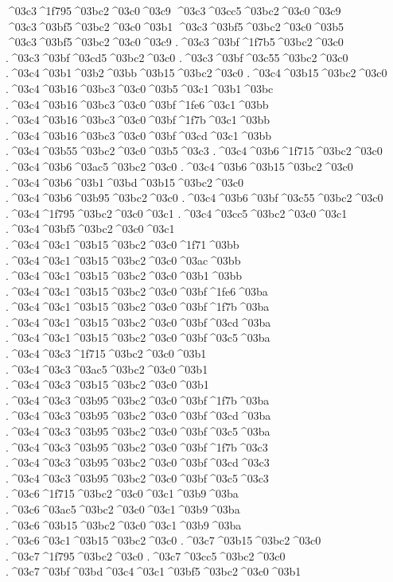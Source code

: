 {^^^^03c3^^^^1f795^^^^03bc2^^^^03c0^^^^03c9  ^^^^03c3^^^^03cc5^^^^03bc2^^^^03c0^^^^03c9
^^^^03c3^^^^03bf5^^^^03bc2^^^^03c0^^^^03b1
^^^^03c3^^^^03bf5^^^^03bc2^^^^03c0^^^^03b5
^^^^03c3^^^^03bf5^^^^03bc2^^^^03c0^^^^03c9
.^^^^03c3^^^^03bf^^^^1f7b5^^^^03bc2^^^^03c0  .^^^^03c3^^^^03bf^^^^03cd5^^^^03bc2^^^^03c0
.^^^^03c3^^^^03bf^^^^03c55^^^^03bc2^^^^03c0
.^^^^03c4^^^^03b1^^^^03b2^^^^03bb^^^^03b15^^^^03bc2^^^^03c0
.^^^^03c4^^^^03b15^^^^03bc2^^^^03c0
.^^^^03c4^^^^03b16^^^^03bc3^^^^03c0^^^^03b5^^^^03c1^^^^03b1^^^^03bc
.^^^^03c4^^^^03b16^^^^03bc3^^^^03c0^^^^03bf^^^^1fe6^^^^03c1^^^^03bb
.^^^^03c4^^^^03b16^^^^03bc3^^^^03c0^^^^03bf^^^^1f7b^^^^03c1^^^^03bb  .^^^^03c4^^^^03b16^^^^03bc3^^^^03c0^^^^03bf^^^^03cd^^^^03c1^^^^03bb
.^^^^03c4^^^^03b55^^^^03bc2^^^^03c0^^^^03b5^^^^03c3
.^^^^03c4^^^^03b6^^^^1f715^^^^03bc2^^^^03c0  .^^^^03c4^^^^03b6^^^^03ac5^^^^03bc2^^^^03c0
.^^^^03c4^^^^03b6^^^^03b15^^^^03bc2^^^^03c0
.^^^^03c4^^^^03b6^^^^03b1^^^^03bd^^^^03b15^^^^03bc2^^^^03c0
.^^^^03c4^^^^03b6^^^^03b95^^^^03bc2^^^^03c0
.^^^^03c4^^^^03b6^^^^03bf^^^^03c55^^^^03bc2^^^^03c0
.^^^^03c4^^^^1f795^^^^03bc2^^^^03c0^^^^03c1  .^^^^03c4^^^^03cc5^^^^03bc2^^^^03c0^^^^03c1
.^^^^03c4^^^^03bf5^^^^03bc2^^^^03c0^^^^03c1
.^^^^03c4^^^^03c1^^^^03b15^^^^03bc2^^^^03c0^^^^1f71^^^^03bb  .^^^^03c4^^^^03c1^^^^03b15^^^^03bc2^^^^03c0^^^^03ac^^^^03bb
.^^^^03c4^^^^03c1^^^^03b15^^^^03bc2^^^^03c0^^^^03b1^^^^03bb
.^^^^03c4^^^^03c1^^^^03b15^^^^03bc2^^^^03c0^^^^03bf^^^^1fe6^^^^03ba
.^^^^03c4^^^^03c1^^^^03b15^^^^03bc2^^^^03c0^^^^03bf^^^^1f7b^^^^03ba  .^^^^03c4^^^^03c1^^^^03b15^^^^03bc2^^^^03c0^^^^03bf^^^^03cd^^^^03ba
.^^^^03c4^^^^03c1^^^^03b15^^^^03bc2^^^^03c0^^^^03bf^^^^03c5^^^^03ba
.^^^^03c4^^^^03c3^^^^1f715^^^^03bc2^^^^03c0^^^^03b1  .^^^^03c4^^^^03c3^^^^03ac5^^^^03bc2^^^^03c0^^^^03b1
.^^^^03c4^^^^03c3^^^^03b15^^^^03bc2^^^^03c0^^^^03b1
.^^^^03c4^^^^03c3^^^^03b95^^^^03bc2^^^^03c0^^^^03bf^^^^1f7b^^^^03ba  .^^^^03c4^^^^03c3^^^^03b95^^^^03bc2^^^^03c0^^^^03bf^^^^03cd^^^^03ba
.^^^^03c4^^^^03c3^^^^03b95^^^^03bc2^^^^03c0^^^^03bf^^^^03c5^^^^03ba
.^^^^03c4^^^^03c3^^^^03b95^^^^03bc2^^^^03c0^^^^03bf^^^^1f7b^^^^03c3  .^^^^03c4^^^^03c3^^^^03b95^^^^03bc2^^^^03c0^^^^03bf^^^^03cd^^^^03c3
.^^^^03c4^^^^03c3^^^^03b95^^^^03bc2^^^^03c0^^^^03bf^^^^03c5^^^^03c3
.^^^^03c6^^^^1f715^^^^03bc2^^^^03c0^^^^03c1^^^^03b9^^^^03ba  .^^^^03c6^^^^03ac5^^^^03bc2^^^^03c0^^^^03c1^^^^03b9^^^^03ba
.^^^^03c6^^^^03b15^^^^03bc2^^^^03c0^^^^03c1^^^^03b9^^^^03ba
.^^^^03c6^^^^03c1^^^^03b15^^^^03bc2^^^^03c0
.^^^^03c7^^^^03b15^^^^03bc2^^^^03c0
.^^^^03c7^^^^1f795^^^^03bc2^^^^03c0  .^^^^03c7^^^^03cc5^^^^03bc2^^^^03c0
.^^^^03c7^^^^03bf^^^^03bd^^^^03c4^^^^03c1^^^^03bf5^^^^03bc2^^^^03c0^^^^03b1
}
